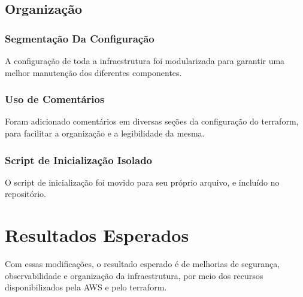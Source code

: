 \documentclass{article}
\begin{document}
\subsection{Organização}
\subsubsection{Segmentação Da Configuração}
A configuração de toda a infraestrutura foi modularizada para garantir uma melhor manutenção dos diferentes componentes.

\subsubsection{Uso de Comentários}
Foram adicionado comentários em diversas seções da configuração do terraform, para facilitar a organização e a legibilidade da mesma.

\subsubsection{Script de Inicialização Isolado}
O script de inicialização foi movido para seu próprio arquivo, e incluído no repositório.
\section{Resultados Esperados}
Com essas modificações, o resultado esperado é de melhorias de segurança, observabilidade e organização da infraestrutura, por meio dos recursos disponibilizados pela AWS e pelo terraform.
\end{document}

